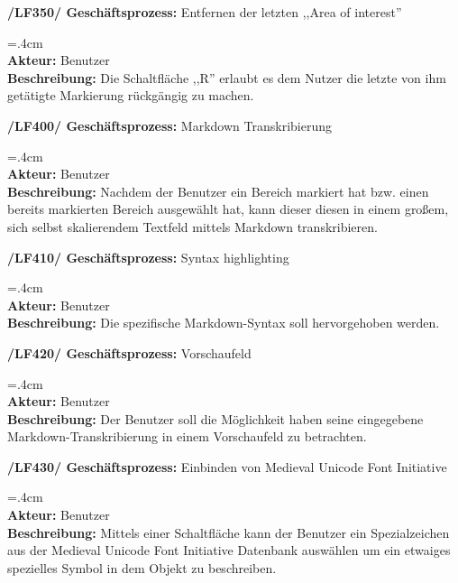 \documentclass{article}
\newenvironment{funcD}{\vspace{-.6cm}\\\par\begingroup\leftskip=.4cm\noindent\\}{\\\par\endgroup\noindent}
\begin{document}
\textbf{/LF350/ Geschäftsprozess:} Entfernen der letzten ,,Area of interest''
\begin{funcD}
    \textbf{Akteur:} Benutzer\vspace{.1cm}\\
    \textbf{Beschreibung:} Die Schaltfläche ,,R'' erlaubt es dem Nutzer die letzte von ihm getätigte Markierung rückgängig zu machen. 
\end{funcD}
\textbf{/LF400/ Geschäftsprozess:} Markdown Transkribierung
\begin{funcD}
    \textbf{Akteur:} Benutzer\vspace{.1cm}\\
    \textbf{Beschreibung:} Nachdem der Benutzer ein Bereich markiert hat bzw. einen bereits markierten Bereich ausgewählt hat, kann dieser diesen in einem großem, sich selbst skalierendem Textfeld mittels Markdown transkribieren. 
\end{funcD}
\textbf{/LF410/ Geschäftsprozess:} Syntax highlighting
\begin{funcD}
    \textbf{Akteur:} Benutzer\vspace{.1cm}\\
    \textbf{Beschreibung:} Die spezifische Markdown-Syntax soll hervorgehoben werden. 
\end{funcD}
\textbf{/LF420/ Geschäftsprozess:} Vorschaufeld
\begin{funcD}
    \textbf{Akteur:} Benutzer\vspace{.1cm}\\
    \textbf{Beschreibung:} Der Benutzer soll die Möglichkeit haben seine eingegebene Markdown-Transkribierung in einem Vorschaufeld zu betrachten.
\end{funcD}
\textbf{/LF430/ Geschäftsprozess:} Einbinden von Medieval Unicode Font Initiative
\begin{funcD}
    \textbf{Akteur:} Benutzer\vspace{.1cm}\\
    \textbf{Beschreibung:} Mittels einer Schaltfläche kann der Benutzer ein Spezialzeichen aus der Medieval Unicode Font Initiative Datenbank auswählen um ein etwaiges spezielles Symbol in dem Objekt zu beschreiben. 
\end{funcD}
\end{document}
